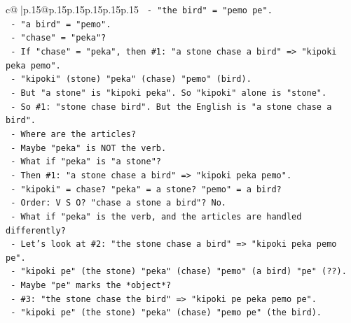 \documentclass{article}
\begin{document}
{\begin{supertabular}{c@{$\;$}|p{.15\linewidth}@{}p{.15\linewidth}p{.15\linewidth}p{.15\linewidth}p{.15\linewidth}p{.15\linewidth}}
{{{\texttt{                                {-} "the bird" = "pemo pe".} \\
\texttt{                                {-} "a bird" = "pemo".} \\
\texttt{                                {-} "chase" = "peka"?} \\
\texttt{                                {-} If "chase" = "peka", then \#1: "a stone chase a bird" => "kipoki peka pemo".} \\
\texttt{                                  {-} "kipoki" (stone) "peka" (chase) "pemo" (bird).} \\
\texttt{                                  {-} But "a stone" is "kipoki peka". So "kipoki" alone is "stone".} \\
\texttt{                                  {-} So \#1: "stone chase bird". But the English is "a stone chase a bird".} \\
\texttt{                                  {-} Where are the articles?} \\
\texttt{                                  {-} Maybe "peka" is NOT the verb.} \\
\texttt{                                  {-} What if "peka" is "a stone"?} \\
\texttt{                                  {-} Then \#1: "a stone chase a bird" => "kipoki peka pemo".} \\
\texttt{                                    {-} "kipoki" = chase? "peka" = a stone? "pemo" = a bird?} \\
\texttt{                                    {-} Order: V S O? "chase a stone a bird"? No.} \\
\texttt{                                  {-} What if "peka" is the verb, and the articles are handled differently?} \\
\texttt{                                  {-} Let's look at \#2: "the stone chase a bird" => "kipoki peka pemo pe".} \\
\texttt{                                    {-} "kipoki pe" (the stone) "peka" (chase) "pemo" (a bird) "pe" (??).} \\
\texttt{                                    {-} Maybe "pe" marks the *object*?} \\
\texttt{                                    {-} \#3: "the stone chase the bird" => "kipoki pe peka pemo pe".} \\
\texttt{                                      {-} "kipoki pe" (the stone) "peka" (chase) "pemo pe" (the bird).} \\
}}}
\end{supertabular}}
\end{document}
